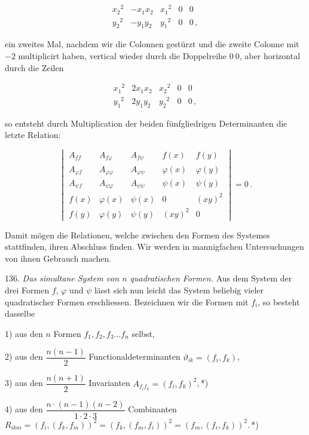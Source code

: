 \[
\begin{aligned}
x_2{}^2 & -x_1x_2 & x_1{}^2 & 0 & 0 \\
y_2{}^2 & -y_1y_2 & y_1{}^2 & 0 & 0\,,
\end{aligned}
\]

ein zweites Mal, nachdem wir die Colonnen gest\"urzt und die zweite Colonne mit $-2$ multiplicirt haben, vertical wieder durch die Doppelreihe $0\ 0$, aber horizontal durch die Zeilen

\[
\begin{aligned}
x_1{}^2 & 2x_1x_2 & x_2{}^2 & 0 & 0 \\
y_1{}^2 & 2y_1y_2 & y_2{}^2 & 0 & 0\,,
\end{aligned}
\]



so entsteht durch Multiplication der beiden f\"unfgliedrigen Determinanten die letzte Relation:

\[
\begin{vmatrix}
A_{ff} & A_{f\varphi} & A_{f\psi} & f(x) & f(y) \\
A_{\varphi f} & A_{\varphi\varphi} & A_{\varphi\psi} & \varphi(x) & \varphi(y) \\
A_{\psi f} & A_{\psi\varphi} & A_{\psi\psi} & \psi(x) & \psi(y) \\
f(x) & \varphi(x) & \psi(x) & 0 & (xy)^2 \\
f(y) & \varphi(y) & \psi(y) & (xy)^2 & 0
\end{vmatrix} = 0\,. \tag{VII}
\]

Damit m\"ogen die Relationen, welche zwischen den Formen des Systemes stattfinden, ihren Abschluss finden. Wir werden in mannigfachen Untersuchungen von ihnen Gebrauch machen.

136. \textit{Das simultane System von $n$ quadratischen Formen.} Aus dem System der drei Formen $f$, $\varphi$ und $\psi$ l\"asst sich nun leicht das System beliebig vieler quadratischer Formen erschliessen. Bezeichnen wir die Formen mit $f_i$, so besteht dasselbe

1) aus den $n$ Formen $f_1, f_2, f_3 \ldots f_n$ selbst,

2) aus den $\dfrac{n(n-1)}{2}$ Functionaldeterminanten $\vartheta_{ik} = (f_i, f_k)$,

3) aus den $\dfrac{n(n+1)}{2}$ Invarianten $A_{f_i f_k} = (f_i, f_k)^2$,\,*)

4) aus den $\dfrac{n\cdot(n-1)(n-2)}{1\cdot 2\cdot 3}$ Combinanten $R_{ikm} = (f_i, (f_k, f_m))^2 = (f_k, (f_m, f_i))^2 = (f_m, (f_i, f_k))^2$.\,*)

